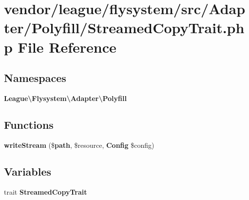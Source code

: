 \section{vendor/league/flysystem/src/\+Adapter/\+Polyfill/\+Streamed\+Copy\+Trait.php File Reference}
\label{_streamed_copy_trait_8php}
\subsection*{Namespaces}
\begin{DoxyCompactItemize}
\item 
 {\bf League\textbackslash{}\+Flysystem\textbackslash{}\+Adapter\textbackslash{}\+Polyfill}
\end{DoxyCompactItemize}
\subsection*{Functions}
\begin{DoxyCompactItemize}
\item 
{\bf write\+Stream} (\${\bf path}, \$resource, {\bf Config} \$config)
\end{DoxyCompactItemize}
\subsection*{Variables}
\begin{DoxyCompactItemize}
\item 
trait {\bf Streamed\+Copy\+Trait}
\end{DoxyCompactItemize}
